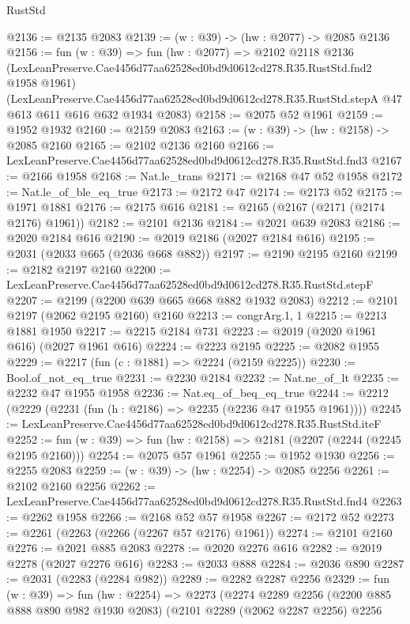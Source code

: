 \begin{lexlean}{RustStd}
\begin{coremodule}
@2136 := @2135 @2083
@2139 := (w : @39) -> (hw : @2077) -> @2085 @2136
@2156 := fun (w : @39) =>
  fun (hw : @2077) =>
  @2102
    @2118
    @2136
    (LexLeanPreserve.Cae4456d77aa62528ed0bd9d0612cd278.R35.RustStd.fnd2 @1958 @1961)
    (LexLeanPreserve.Cae4456d77aa62528ed0bd9d0612cd278.R35.RustStd.stepA
      @47
      @613
      @611
      @616
      @632
      @1934
      @2083)
@2158 := @2075 @52 @1961
@2159 := @1952 @1932
@2160 := @2159 @2083
@2163 := (w : @39) -> (hw : @2158) -> @2085 @2160
@2165 := @2102 @2136 @2160
@2166 := LexLeanPreserve.Cae4456d77aa62528ed0bd9d0612cd278.R35.RustStd.fnd3
@2167 := @2166 @1958
@2168 := Nat.le_trans
@2171 := @2168 @47 @52 @1958
@2172 := Nat.le_of_ble_eq_true
@2173 := @2172 @47
@2174 := @2173 @52
@2175 := @1971 @1881
@2176 := @2175 @616
@2181 := @2165 (@2167 (@2171 (@2174 @2176) @1961))
@2182 := @2101 @2136
@2184 := @2021 @639 @2083
@2186 := @2020 @2184 @616
@2190 := @2019 @2186 (@2027 @2184 @616)
@2195 := @2031 (@2033 @665 (@2036 @668 @882))
@2197 := @2190 @2195 @2160
@2199 := @2182 @2197 @2160
@2200 := LexLeanPreserve.Cae4456d77aa62528ed0bd9d0612cd278.R35.RustStd.stepF
@2207 := @2199 (@2200 @639 @665 @668 @882 @1932 @2083)
@2212 := @2101 @2197 (@2062 @2195 @2160) @2160
@2213 := congrArg.{1, 1}
@2215 := @2213 @1881 @1950
@2217 := @2215 @2184 @731
@2223 := @2019 (@2020 @1961 @616) (@2027 @1961 @616)
@2224 := @2223 @2195
@2225 := @2082 @1955
@2229 := @2217 (fun (c : @1881) => @2224 (@2159 @2225))
@2230 := Bool.of_not_eq_true
@2231 := @2230 @2184
@2232 := Nat.ne_of_lt
@2235 := @2232 @47 @1955 @1958
@2236 := Nat.eq_of_beq_eq_true
@2244 := @2212 (@2229 (@2231 (fun (h : @2186) => @2235 (@2236 @47 @1955 @1961))))
@2245 := LexLeanPreserve.Cae4456d77aa62528ed0bd9d0612cd278.R35.RustStd.iteF
@2252 := fun (w : @39) => fun (hw : @2158) => @2181 (@2207 (@2244 (@2245 @2195 @2160)))
@2254 := @2075 @57 @1961
@2255 := @1952 @1930
@2256 := @2255 @2083
@2259 := (w : @39) -> (hw : @2254) -> @2085 @2256
@2261 := @2102 @2160 @2256
@2262 := LexLeanPreserve.Cae4456d77aa62528ed0bd9d0612cd278.R35.RustStd.fnd4
@2263 := @2262 @1958
@2266 := @2168 @52 @57 @1958
@2267 := @2172 @52
@2273 := @2261 (@2263 (@2266 (@2267 @57 @2176) @1961))
@2274 := @2101 @2160
@2276 := @2021 @885 @2083
@2278 := @2020 @2276 @616
@2282 := @2019 @2278 (@2027 @2276 @616)
@2283 := @2033 @888
@2284 := @2036 @890
@2287 := @2031 (@2283 (@2284 @982))
@2289 := @2282 @2287 @2256
@2329 := fun (w : @39) =>
  fun (hw : @2254) =>
  @2273
    (@2274
      @2289
      @2256
      (@2200 @885 @888 @890 @982 @1930 @2083)
      (@2101
        @2289
        (@2062 @2287 @2256)
        @2256

\end{coremodule}
\end{lexlean}

